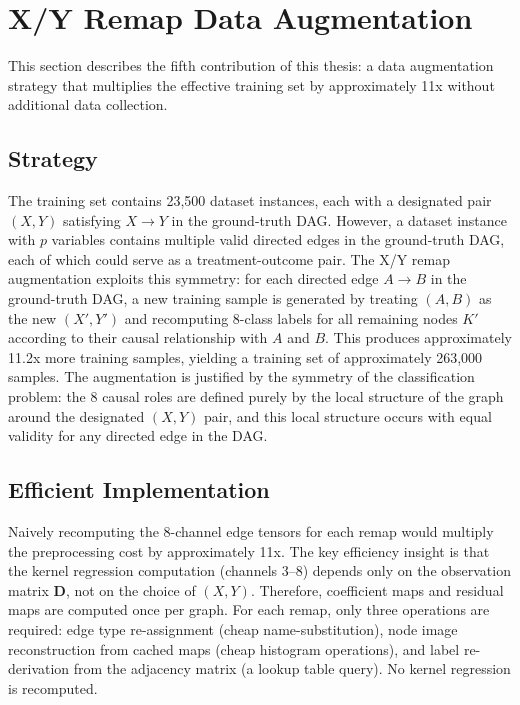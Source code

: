 \section{X/Y Remap Data Augmentation}
\label{sec:xyaug}

This section describes the fifth contribution of this thesis: a data augmentation strategy that multiplies the effective training set by approximately 11x without additional data collection.

\subsection{Strategy}

The training set contains 23,500 dataset instances, each with a designated pair $(X, Y)$ satisfying $X \to Y$ in the ground-truth DAG. However, a dataset instance with $p$ variables contains multiple valid directed edges in the ground-truth DAG, each of which could serve as a treatment-outcome pair. The X/Y remap augmentation exploits this symmetry: for each directed edge $A \to B$ in the ground-truth DAG, a new training sample is generated by treating $(A, B)$ as the new $(X', Y')$ and recomputing 8-class labels for all remaining nodes $K'$ according to their causal relationship with $A$ and $B$. This produces approximately 11.2x more training samples, yielding a training set of approximately 263,000 samples. The augmentation is justified by the symmetry of the classification problem: the 8 causal roles are defined purely by the local structure of the graph around the designated $(X, Y)$ pair, and this local structure occurs with equal validity for any directed edge in the DAG.

\subsection{Efficient Implementation}

Naively recomputing the 8-channel edge tensors for each remap would multiply the preprocessing cost by approximately 11x. The key efficiency insight is that the kernel regression computation (channels 3--8) depends only on the observation matrix $\mathbf{D}$, not on the choice of $(X, Y)$. Therefore, coefficient maps and residual maps are computed once per graph. For each remap, only three operations are required: edge type re-assignment (cheap name-substitution), node image reconstruction from cached maps (cheap histogram operations), and label re-derivation from the adjacency matrix (a lookup table query). No kernel regression is recomputed.

